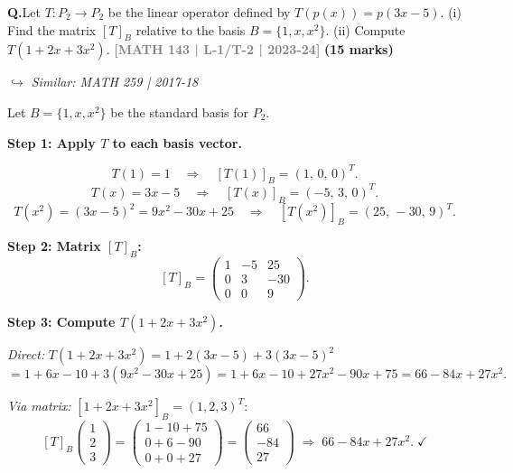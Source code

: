 \documentclass[12pt,a3paper]{article}
\newcommand{\yr}[1]{\hfill\textcolor{gray}{\small\textbf{[#1]}}}
\newcommand{\mk}[1]{\textcolor{orange!70!black}{\small\textbf{(#1 marks)}}}
\newcommand{\variant}[1]{\par\vspace{1pt}\textcolor{blue!50!black}%
  {\footnotesize\textit{$\hookrightarrow$ Similar: #1}}}
\newcounter{qnum}
\newcommand{\Q}[1]{%
  \needspace{4\baselineskip}
  \refstepcounter{qnum}
  \vspace{6pt}
  \noindent\textbf{Q\theqnum.}\enspace #1\par
}
\begin{document}
\Q{Let $T: P_2 \to P_2$ be the linear operator defined by $T(p(x)) = p(3x-5)$. (i) Find the matrix $[T]_B$ relative to the basis $B = \{1, x, x^2\}$. (ii) Compute $T(1 + 2x + 3x^2)$.
\yr{MATH 143 | L-1/T-2 | 2023-24} \mk{15}
\variant{MATH 259 | 2017-18}}
\begin{tcolorbox}[enhanced,breakable,
  colback=cF!4,colframe=cF,boxrule=0.8pt,arc=5pt,
  title={\textbf{Answer --- $T:P_2\to P_2$, $T(p(x))=p(3x-5)$: Matrix $[T]_B$ \& Computation}},
  fonttitle=\bfseries\color{white},colbacktitle=cF]

Let $B=\{1,x,x^2\}$ be the standard basis for $P_2$.

\textbf{Step 1: Apply $T$ to each basis vector.}

\[
T(1)=1\quad\Rightarrow\quad[T(1)]_B=(1,\,0,\,0)^T.
\]
\[
T(x)=3x-5\quad\Rightarrow\quad[T(x)]_B=(-5,\,3,\,0)^T.
\]
\[
T(x^2)=(3x-5)^2=9x^2-30x+25\quad\Rightarrow\quad[T(x^2)]_B=(25,\,-30,\,9)^T.
\]

\textbf{Step 2: Matrix $[T]_B$:}
\[
[T]_B=\begin{pmatrix}1&-5&25\\0&3&-30\\0&0&9\end{pmatrix}.
\]

\textbf{Step 3: Compute $T(1+2x+3x^2)$.}

\textit{Direct:} $T(1+2x+3x^2)=1+2(3x-5)+3(3x-5)^2$
\[
=1+6x-10+3(9x^2-30x+25)=1+6x-10+27x^2-90x+75=\boxed{66-84x+27x^2}.
\]

\textit{Via matrix:} $[1+2x+3x^2]_B=(1,2,3)^T$:
\[
[T]_B\begin{pmatrix}1\\2\\3\end{pmatrix}=\begin{pmatrix}1-10+75\\0+6-90\\0+0+27\end{pmatrix}=\begin{pmatrix}66\\-84\\27\end{pmatrix}
\;\Rightarrow\; 66-84x+27x^2.\;\checkmark
\]

\end{tcolorbox}
\end{document}
